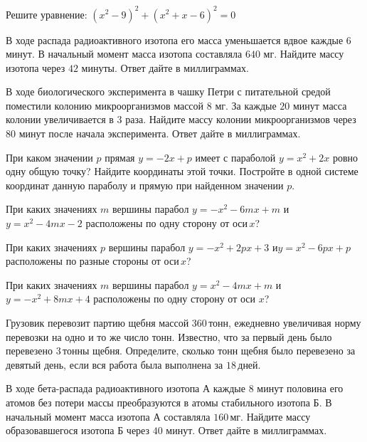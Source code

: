\begin{class}[number=6]
	\begin{listofex}
		\item Решите уравнение: \quad \( (x^2-9)^2+(x^2+x-6)^2=0 \)
		\item В ходе распада радиоактивного изотопа его масса уменьшается вдвое каждые \( 6 \) минут. В начальный момент масса изотопа составляла \( 640 \) мг. Найдите массу изотопа через \( 42 \) минуты. Ответ дайте в миллиграммах.
		\item В ходе биологического эксперимента в чашку Петри с питательной средой поместили колонию микроорганизмов массой \( 8 \) мг. За каждые \( 20 \) минут масса колонии увеличивается в \( 3 \) раза. Найдите массу колонии микроорганизмов через \( 80 \) минут после начала эксперимента. Ответ дайте в миллиграммах.
		\item При каком значении \( p \) прямая \( y=-2x+p \) имеет с параболой \( y=x^2+2x \) ровно одну общую точку? Найдите координаты этой точки. Постройте в одной системе координат данную параболу и прямую при найденном значении \( p \).
		\item При каких значениях \( m \) вершины парабол \( y =-x^2-6mx+m \) и \( y= x^2-4mx-2 \) расположены по одну сторону от оси \( x \)?		
		\item При каких значениях \( p \) вершины парабол \( y= -x^2+2px+3 \) и\( y= x^2-6px+p \) расположены по разные стороны от оси \( x \)?
	\end{listofex}
\end{class}

\begin{homework}[number=3]
	\begin{listofex}
		\item При каких значениях \( m \) вершины парабол \( y= x^2-4mx+m \) и \(y=-x^2+8mx+4 \) расположены по одну сторону от оси \( x \)?
		\item Грузовик перевозит партию щебня массой \( 360 \) тонн, ежедневно увеличивая норму перевозки на одно и то же число тонн. Известно, что за первый день было перевезено \( 3 \) тонны щебня. Определите, сколько тонн щебня было перевезено за девятый день, если вся работа была выполнена за \( 18 \) дней.
		\item В ходе бета-распада радиоактивного изотопа А каждые \( 8 \) минут половина его атомов без потери массы преобразуются в атомы стабильного изотопа Б. В начальный момент масса изотопа А составляла \( 160 \) мг. Найдите массу образовавшегося изотопа Б через \( 40 \) минут. Ответ дайте в миллиграммах.
	\end{listofex}
\end{homework}

